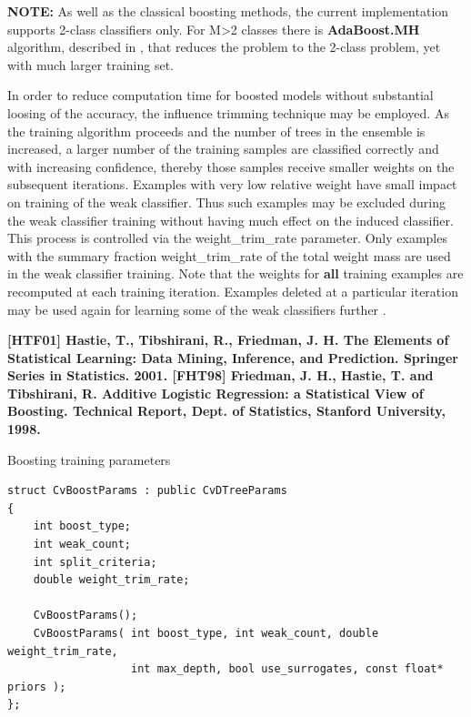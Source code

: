 \textbf{NOTE:} As well as the classical boosting methods, the current implementation supports 2-class classifiers only. For M>2 classes there is \textbf{AdaBoost.MH} algorithm, described in , that reduces the problem to the 2-class problem, yet with much larger training set.

In order to reduce computation time for boosted models without substantial loosing of the accuracy, the influence trimming technique may be employed. As the training algorithm proceeds and the number of trees in the ensemble is increased, a larger number of the training samples are classified correctly and with increasing confidence, thereby those samples receive smaller weights on the subsequent iterations. Examples with very low relative weight have small impact on training of the weak classifier. Thus such examples may be excluded during the weak classifier training without having much effect on the induced classifier. This process is controlled via the weight\_trim\_rate parameter. Only examples with the summary fraction weight\_trim\_rate of the total weight mass are used in the weak classifier training. Note that the weights for \textbf{all} training examples are recomputed at each training iteration. Examples deleted at a particular iteration may be used again for learning some of the weak classifiers further .

\textbf{[HTF01] Hastie, T., Tibshirani, R., Friedman, J. H. The Elements of Statistical Learning: Data Mining, Inference, and Prediction. Springer Series in Statistics. 2001.
[FHT98] Friedman, J. H., Hastie, T. and Tibshirani, R. Additive Logistic Regression: a Statistical View of Boosting. Technical Report, Dept. of Statistics, Stanford University, 1998.}



Boosting training parameters

\begin{lstlisting}
struct CvBoostParams : public CvDTreeParams
{
    int boost_type;
    int weak_count;
    int split_criteria;
    double weight_trim_rate;

    CvBoostParams();
    CvBoostParams( int boost_type, int weak_count, double weight_trim_rate,
                   int max_depth, bool use_surrogates, const float* priors );
};
\end{lstlisting}

